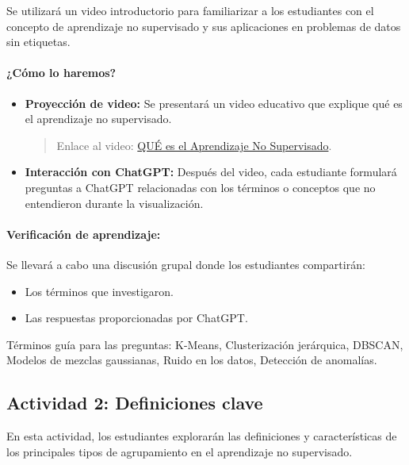 \documentclass[a4,11pt]{aleph-notas}
\begin{document}
Se utilizará un video introductorio para familiarizar a los estudiantes con el concepto de aprendizaje no supervisado y sus aplicaciones en problemas de datos sin etiquetas.

\paragraph{¿Cómo lo haremos?}  
\begin{itemize}[leftmargin=*]
    \item \textbf{Proyección de video:}  
    Se presentará un video educativo que explique qué es el aprendizaje no supervisado.
    \begin{quote}
        Enlace al video: \href{https://www.youtube.com/watch?v=WM7XaTyX7O8}{QUÉ es el Aprendizaje No Supervisado}.
    \end{quote}
    \item \textbf{Interacción con ChatGPT:}  
    Después del video, cada estudiante formulará preguntas a ChatGPT relacionadas con los términos o conceptos que no entendieron durante la visualización.
\end{itemize}

\paragraph{Verificación de aprendizaje:}  
Se llevará a cabo una discusión grupal donde los estudiantes compartirán:
\begin{itemize}[leftmargin=*]
    \item Los términos que investigaron.
    \item Las respuestas proporcionadas por ChatGPT.
\end{itemize}
Términos guía para las preguntas: K-Means, Clusterización jerárquica, DBSCAN, Modelos de mezclas gaussianas, Ruido en los datos, Detección de anomalías.

\subsection*{Actividad 2: Definiciones clave}

En esta actividad, los estudiantes explorarán las definiciones y características de los principales tipos de agrupamiento en el aprendizaje no supervisado.
\end{document}
